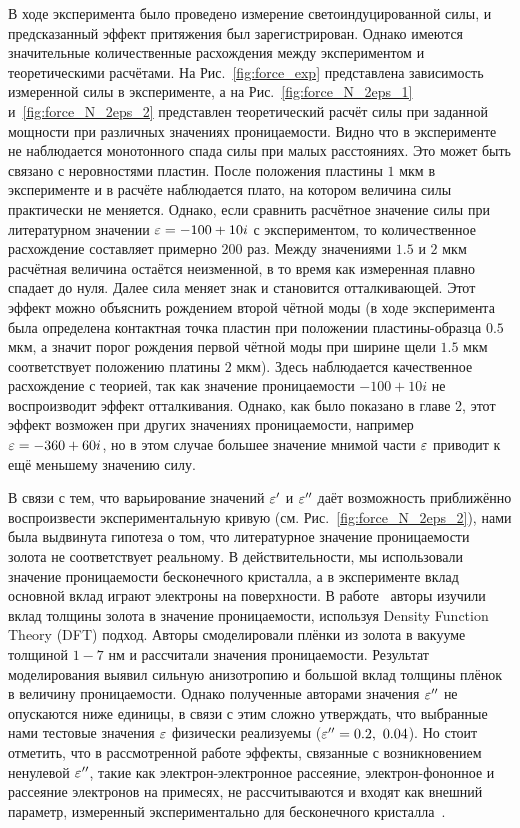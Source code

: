 В ходе эксперимента было проведено измерение светоиндуцированной силы, и предсказанный эффект притяжения был зарегистрирован. Однако имеются значительные количественные расхождения между экспериментом и теоретическими расчётами. На Рис.~\ref{fig:force_exp} представлена зависимость измеренной силы в эксперименте, а на Рис.~\ref{fig:force_N_2eps_1} и~\ref{fig:force_N_2eps_2} представлен теоретический расчёт силы при заданной мощности при различных значениях проницаемости. Видно что в эксперименте не наблюдается монотонного спада силы при малых расстояниях. Это может быть связано с неровностями пластин. После положения пластины $1$ мкм в эксперименте и в расчёте наблюдается плато, на котором величина силы практически не меняется. Однако, если сравнить расчётное значение силы при литературном значении $\varepsilon = -100+10i$ с экспериментом, то количественное расхождение составляет примерно $200$ раз.  Между значениями $1.5$ и $2$ мкм расчётная величина остаётся неизменной, в то время как измеренная плавно спадает до нуля. Далее сила меняет знак и становится отталкивающей. Этот эффект можно объяснить рождением второй чётной моды (в ходе эксперимента была определена контактная точка пластин при положении пластины-образца $0.5$ мкм, а значит порог рождения первой чётной моды при ширине щели $1.5$ мкм соответствует положению платины $2$ мкм). Здесь наблюдается качественное расхождение с теорией, так как  значение проницаемости $-100 + 10i$ не воспроизводит эффект отталкивания. Однако, как было показано в главе 2, этот эффект возможен при других значениях проницаемости, например $\varepsilon = -360+60i$, но в этом случае большее значение мнимой части $\varepsilon$ приводит к ещё меньшему значению силу. 

В связи с тем, что варьирование значений $\varepsilon'$ и $\varepsilon''$ даёт возможность приближённо воспроизвести экспериментальную кривую (см. Рис.~\ref{fig:force_N_2eps_2}), нами была выдвинута гипотеза о том, что литературное значение проницаемости золота не соответствует реальному. В действительности, мы использовали значение проницаемости бесконечного кристалла, а в эксперименте вклад основной вклад играют электроны на поверхности. В работе~\cite{laref2013size} авторы изучили вклад толщины золота в значение проницаемости, используя Density Function Theory (DFT) подход. Авторы смоделировали плёнки из золота в вакууме толщиной $1-7$ нм и рассчитали значения проницаемости. Результат моделирования выявил сильную анизотропию и большой вклад толщины плёнок в величину проницаемости. Однако полученные авторами значения $\varepsilon''$ не опускаются ниже единицы, в связи с этим сложно утверждать, что выбранные нами тестовые значения $\varepsilon$ физически реализуемы ($\varepsilon'' = 0.2,\ 0.04$). Но стоит отметить, что в рассмотренной работе эффекты, связанные с возникновением ненулевой $\varepsilon''$, такие как электрон-электронное рассеяние, электрон-фононное и рассеяние электронов на примесях, не рассчитываются и входят как внешний параметр, измеренный экспериментально для бесконечного кристалла~\cite{blaber2009search}.

